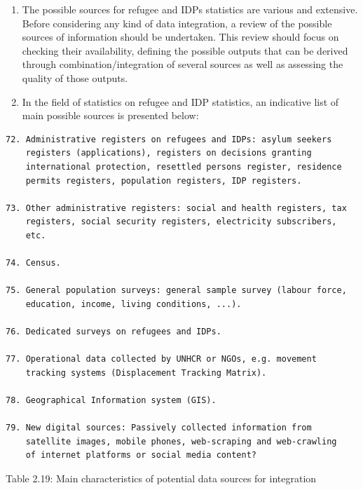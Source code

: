 \documentclass[
]{article}
\begin{document}
\begin{enumerate}
\def\labelenumi{\arabic{enumi}.}
\setcounter{enumi}{213}
\item
  The possible sources for refugee and IDPs statistics are various
  and extensive. Before considering any kind of data integration, a
  review of the possible sources of information should be undertaken.
  This review should focus on checking their availability, defining
  the possible outputs that can be derived through
  combination/integration of several sources as well as assessing the
  quality of those outputs.
\item
  In the field of statistics on refugee and IDP statistics, an
  indicative list of main possible sources is presented below:
\end{enumerate}

\begin{verbatim}
72. Administrative registers on refugees and IDPs: asylum seekers
    registers (applications), registers on decisions granting
    international protection, resettled persons register, residence
    permits registers, population registers, IDP registers.

73. Other administrative registers: social and health registers, tax
    registers, social security registers, electricity subscribers,
    etc.

74. Census.

75. General population surveys: general sample survey (labour force,
    education, income, living conditions, ...).

76. Dedicated surveys on refugees and IDPs.

77. Operational data collected by UNHCR or NGOs, e.g. movement
    tracking systems (Displacement Tracking Matrix).

78. Geographical Information system (GIS).

79. New digital sources: Passively collected information from
    satellite images, mobile phones, web-scraping and web-crawling
    of internet platforms or social media content?
\end{verbatim}

Table 2.19: Main characteristics of potential data sources for
integration
\end{document}
